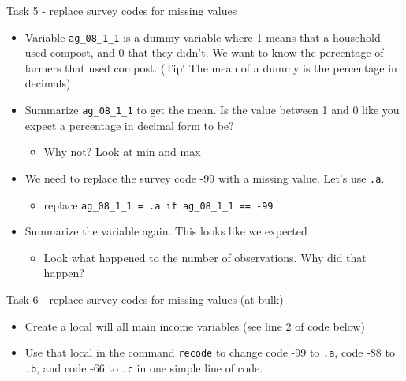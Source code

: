 \documentclass[aspectratio=169]{beamer}
\newcommand{\codeexample}[2]{
	\begin{figure}
		\VerbatimInput[
		framesep=3mm,
		frame=lines, %
		numbers=left, %
		label= #1, %
		baselinestretch=0.90, %
		]{#2} %
	\end{figure}
	\FloatBarrier
}
\begin{document}
\begin{frame}{Task 5 - replace survey codes for missing values}
	\begin{itemize}
		\item Variable \texttt{ag\_08\_1\_1} is a dummy variable where 1 means that a household used compost, and 0 that they didn’t. We want to know the percentage of farmers that used compost. (Tip! The mean of a dummy is the percentage in decimals)
		\item Summarize \texttt{ag\_08\_1\_1} to get the mean. Is the value between 1 and 0 like you expect a percentage in decimal form to be?
			\begin{itemize}
				\item Why not? Look at min and max
			\end{itemize}
		\item We need to replace the survey code -99 with a missing value. Let’s use \texttt{.a}.
			\begin{itemize}
				\item replace \texttt{ag\_08\_1\_1 = .a if ag\_08\_1\_1 == -99}
			\end{itemize}
		\item Summarize the variable again. This looks like we expected
			\begin{itemize}
				\item Look what happened to the number of observations. Why did that happen?
			\end{itemize}
	\end{itemize}
\end{frame}

\begin{frame}{Task 6 - replace survey codes for missing values (at bulk)}
	\begin{itemize}
		\item Create a local will all main income variables (see line 2 of code below)
		\item Use that local in the command \texttt{recode} to change code -99 to \texttt{.a}, code -88 to \texttt{.b}, and code -66 to \texttt{.c} in one simple line of code.
	\end{itemize}

	\codeexample{encode.do}{code/recode.do}
\end{frame}
\end{document}
